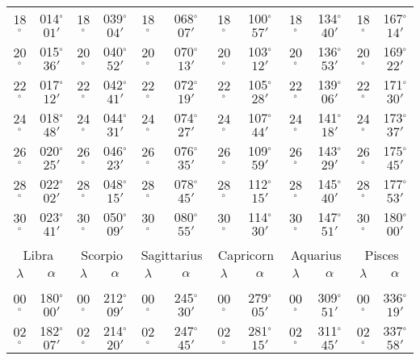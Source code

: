 \begin{table}
{\begin{tabular}{cc|cc|cc|cc|cc|cc}
18$^\circ$ & 014$^\circ$$01'$ & 18$^\circ$ & 039$^\circ$$04'$ & 18$^\circ$ & 068$^\circ$$07'$ & 18$^\circ$ & 100$^\circ$$57'$ & 18$^\circ$ & 134$^\circ$$40'$ & 18$^\circ$ & 167$^\circ$$14'$\\
20$^\circ$ & 015$^\circ$$36'$ & 20$^\circ$ & 040$^\circ$$52'$ & 20$^\circ$ & 070$^\circ$$13'$ & 20$^\circ$ & 103$^\circ$$12'$ & 20$^\circ$ & 136$^\circ$$53'$ & 20$^\circ$ & 169$^\circ$$22'$\\
22$^\circ$ & 017$^\circ$$12'$ & 22$^\circ$ & 042$^\circ$$41'$ & 22$^\circ$ & 072$^\circ$$19'$ & 22$^\circ$ & 105$^\circ$$28'$ & 22$^\circ$ & 139$^\circ$$06'$ & 22$^\circ$ & 171$^\circ$$30'$\\
24$^\circ$ & 018$^\circ$$48'$ & 24$^\circ$ & 044$^\circ$$31'$ & 24$^\circ$ & 074$^\circ$$27'$ & 24$^\circ$ & 107$^\circ$$44'$ & 24$^\circ$ & 141$^\circ$$18'$ & 24$^\circ$ & 173$^\circ$$37'$\\
26$^\circ$ & 020$^\circ$$25'$ & 26$^\circ$ & 046$^\circ$$23'$ & 26$^\circ$ & 076$^\circ$$35'$ & 26$^\circ$ & 109$^\circ$$59'$ & 26$^\circ$ & 143$^\circ$$29'$ & 26$^\circ$ & 175$^\circ$$45'$\\
28$^\circ$ & 022$^\circ$$02'$ & 28$^\circ$ & 048$^\circ$$15'$ & 28$^\circ$ & 078$^\circ$$45'$ & 28$^\circ$ & 112$^\circ$$15'$ & 28$^\circ$ & 145$^\circ$$40'$ & 28$^\circ$ & 177$^\circ$$53'$\\
30$^\circ$ & 023$^\circ$$41'$ & 30$^\circ$ & 050$^\circ$$09'$ & 30$^\circ$ & 080$^\circ$$55'$ & 30$^\circ$ & 114$^\circ$$30'$ & 30$^\circ$ & 147$^\circ$$51'$ & 30$^\circ$ & 180$^\circ$$00'$\\
\multicolumn{12}{c}{}\\
\multicolumn{2}{c}{Libra}\vline & \multicolumn{2}{c}{Scorpio} \vline& \multicolumn{2}{c}{Sagittarius} \vline& \multicolumn{2}{c}{Capricorn}\vline &
\multicolumn{2}{c}{Aquarius}\vline & \multicolumn{2}{c}{Pisces}\\\hline
$\lambda$& $\alpha$& $\lambda$& $\alpha$& $\lambda$& $\alpha$& $\lambda$& $\alpha$& $\lambda$& $\alpha$& $\lambda$& $\alpha$\\\hline
&&&&&&&&&&&\\[-2ex]
00$^\circ$ & 180$^\circ$$00'$ & 00$^\circ$ & 212$^\circ$$09'$ & 00$^\circ$ & 245$^\circ$$30'$ & 00$^\circ$ & 279$^\circ$$05'$ &  00$^\circ$ & 309$^\circ$$51'$ & 00$^\circ$ & 336$^\circ$$19'$\\
02$^\circ$ & 182$^\circ$$07'$ & 02$^\circ$ & 214$^\circ$$20'$ & 02$^\circ$ & 247$^\circ$$45'$ & 02$^\circ$ & 281$^\circ$$15'$ &  02$^\circ$ & 311$^\circ$$45'$ & 02$^\circ$ & 337$^\circ$$58'$\\

\end{tabular}}
\end{table}
